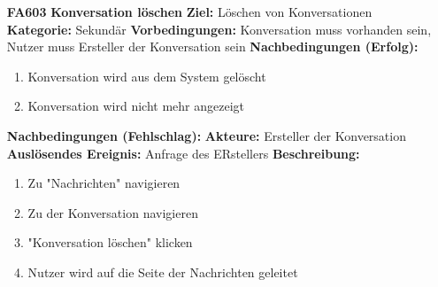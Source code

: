\documentclass[parskip=full]{scrartcl}
\begin{document}
\begin{itemize}[nosep]
			
			\item[\textbf{FA603}]\textbf{ \gls{Konversation} löschen} \label{sec:FA603}
			\newline \textbf{Ziel:} Löschen von \gls{Konversation}en
			\newline \textbf{Kategorie:} Sekundär
			\newline \textbf{Vorbedingungen:} \gls{Konversation} muss vorhanden sein, Nutzer muss Ersteller der \gls{Konversation} sein
			\newline \textbf{Nachbedingungen (Erfolg):} 
			\begin{enumerate}[nosep]
				\item \gls{Konversation} wird aus dem System gelöscht
				\item \gls{Konversation} wird nicht mehr angezeigt 
			\end{enumerate}
			\textbf{Nachbedingungen (Fehlschlag):}
			\newline \textbf{Akteure:} Ersteller der \gls{Konversation}
			\newline \textbf{Auslösendes Ereignis:} Anfrage des ERstellers
			\newline \textbf{Beschreibung:}
			\begin{enumerate}[nosep]
				\item Zu "Nachrichten" navigieren
				\item Zu der \gls{Konversation} navigieren
				\item "\gls{Konversation} löschen" klicken
				\item Nutzer wird auf die Seite der Nachrichten geleitet\\
			\end{enumerate}							
		\end{itemize}
		
\end{document}
